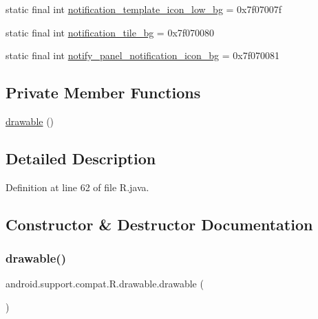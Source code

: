\begin{DoxyCompactItemize}
\item 
static final int \mbox{\hyperlink{classandroid_1_1support_1_1compat_1_1_r_1_1drawable_a0b6c638ec19c3a21b0f3b82ab4af62fe}{notification\+\_\+template\+\_\+icon\+\_\+low\+\_\+bg}} = 0x7f07007f
\item 
static final int \mbox{\hyperlink{classandroid_1_1support_1_1compat_1_1_r_1_1drawable_a6ab5153e2c67f18967cc5d392013321d}{notification\+\_\+tile\+\_\+bg}} = 0x7f070080
\item 
static final int \mbox{\hyperlink{classandroid_1_1support_1_1compat_1_1_r_1_1drawable_ac2f70454d50b1ec6c8a6a761a78edcb2}{notify\+\_\+panel\+\_\+notification\+\_\+icon\+\_\+bg}} = 0x7f070081
\end{DoxyCompactItemize}
\subsection*{Private Member Functions}
\begin{DoxyCompactItemize}
\item 
\mbox{\hyperlink{classandroid_1_1support_1_1compat_1_1_r_1_1drawable_af5b05cd39773159b0fccd1da4d478004}{drawable}} ()
\end{DoxyCompactItemize}


\subsection{Detailed Description}


Definition at line 62 of file R.\+java.



\subsection{Constructor \& Destructor Documentation}
\mbox{\label{classandroid_1_1support_1_1compat_1_1_r_1_1drawable_af5b05cd39773159b0fccd1da4d478004}} 
\subsubsection{\texorpdfstring{drawable()}{drawable()}}
{\footnotesize\ttfamily android.\+support.\+compat.\+R.\+drawable.\+drawable (\begin{DoxyParamCaption}{ }\end{DoxyParamCaption})\hspace{0.3cm}{\ttfamily [private]}}



